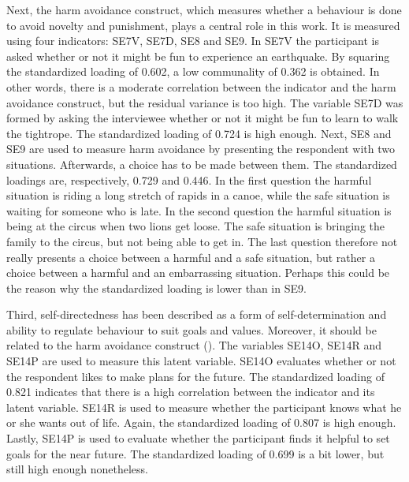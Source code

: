 \documentclass[11pt]{article}
\begin{document}

Next, the harm avoidance construct, which measures whether a behaviour is done to
avoid novelty and punishment, plays a central role in this work. It is measured
using four indicators: SE7V, SE7D, SE8 and SE9.
In SE7V the participant is asked whether or not it might be fun to experience an
earthquake. By squaring the standardized loading of 0.602, a low communality of
0.362 is obtained. In other words, there is a moderate correlation between the
indicator and the harm avoidance construct, but the residual variance is too high.
The variable SE7D was formed by asking the interviewee whether or not it might be
fun to learn to walk the tightrope. The standardized loading of 0.724 is high enough.
Next, SE8 and SE9 are used to measure harm avoidance by presenting the respondent
with two situations. Afterwards, a choice has to be made between them. The
standardized loadings are, respectively, 0.729 and 0.446. In the first question
the harmful situation is riding a long stretch of rapids in a canoe, while the
safe situation is waiting for someone who is late. In the second question the
harmful situation is being at the circus when two lions get loose. The safe
situation is bringing the family to the circus, but not being able to get in.
The last question therefore not really presents a choice between a harmful and
a safe situation, but rather a choice between a harmful and an embarrassing
situation. Perhaps this could be the reason why the standardized loading is
lower than in SE9.


Third, self-directedness has been described as a form of self-determination and
ability to regulate behaviour to suit goals and values. Moreover, it should be
related to the harm avoidance construct (\cite{tse2011}).
The variables SE14O, SE14R and SE14P are used to measure this latent variable.
SE14O evaluates whether or not the respondent likes to make plans for the future.
The standardized loading of 0.821 indicates that there is a high correlation
between the indicator and its latent variable. SE14R is used to measure whether
the participant knows what he or she wants out of life. Again, the standardized
loading of 0.807 is high enough. Lastly, SE14P is used to evaluate whether the
participant finds it helpful to set goals for the near future. The standardized
loading of 0.699 is a bit lower, but still high enough nonetheless.
\end{document}

